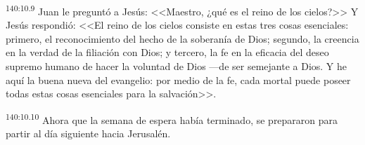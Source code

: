 \par 
\textsuperscript{140:10.9} Juan le preguntó a Jesús: <<Maestro, ¿qué es el reino de los cielos?>> Y Jesús respondió: <<El reino de los cielos consiste en estas tres cosas esenciales: primero, el reconocimiento del hecho de la soberanía de Dios; segundo, la creencia en la verdad de la filiación con Dios; y tercero, la fe en la eficacia del deseo supremo humano de hacer la voluntad de Dios ---de ser semejante a Dios. Y he aquí la buena nueva del evangelio: por medio de la fe, cada mortal puede poseer todas estas cosas esenciales para la salvación>>.

\par 
\textsuperscript{140:10.10} Ahora que la semana de espera había terminado, se prepararon para partir al día siguiente hacia Jerusalén.